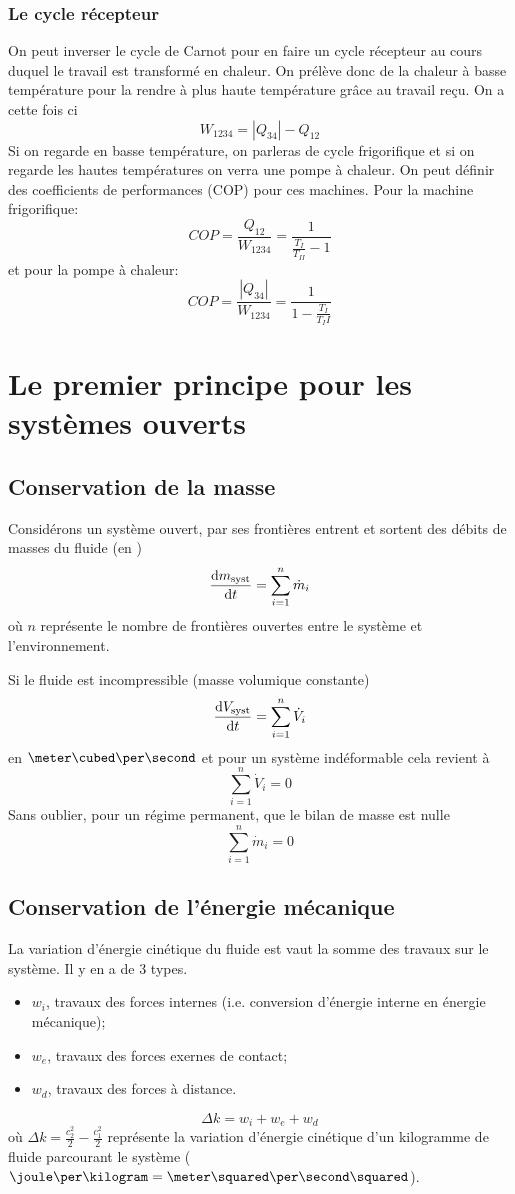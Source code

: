 \subsubsection{Le cycle récepteur}
On peut inverser le cycle de Carnot pour en faire
un cycle récepteur au cours duquel le travail est transformé en chaleur.
On prélève donc de la chaleur à basse température pour
la rendre à plus haute température grâce au travail reçu.
On a cette fois ci
\[ W_{1234} = |Q_{34}|-Q_{12} \]
Si on regarde en basse température, on parleras de cycle frigorifique et
si on regarde les hautes températures on verra une pompe à chaleur.
On peut définir des coefficients de performances (COP) pour ces machines.
Pour la machine frigorifique:
\[  COP =  \frac {Q_{12}}{W_{1234}} = \frac{1}{\frac{T_I}{T_{II}} -1} \]
et pour la pompe à chaleur:
\[  COP = \frac{|Q_{34}|}{W_{1234}} = \frac {1} {1-\frac{T_I}{T_II}} \]

\section{Le premier principe pour les systèmes ouverts}
\subsection{Conservation de la masse}
Considérons un système ouvert, par ses frontières entrent et
sortent des débits de masses du fluide (en \kilogram\per\second)
\[ \frac{\operatorname{d}\! m_\mathrm{syst}}{\operatorname{d}\! t} = \sum_{i = 1}^{n} \dot m_i \]
où $n$ représente le nombre de frontières ouvertes entre
le système et l'environnement.

Si le fluide est incompressible (masse volumique constante)
\[ \frac{\operatorname{d}\! V_\mathrm{syst}}{\operatorname{d}\! t} = \sum_{i = 1}^{n}\dot V_i \]
en $\meter\cubed\per\second$ et pour un système indéformable cela revient à
\[  \sum_{i = 1}^n \dot V_i = 0 \]
Sans oublier, pour un régime permanent, que le bilan de masse est nulle
\[ \sum_{i = 1}^n \dot m_i = 0 \]

\subsection{Conservation de l'énergie mécanique}
La variation d'énergie cinétique du fluide est vaut
la somme des travaux sur le système.
Il y en a de 3 types.
\begin{itemize}
  \item $w_i$, travaux des forces internes
    (i.e. conversion d'énergie interne en énergie mécanique);
  \item $w_e$, travaux des forces exernes de contact;
  \item $w_d$, travaux des forces à distance.
\end{itemize}
\[ \Delta k = w_i + w_e + w_d \]
où $\Delta k = \frac{c_2^2}{2}-\frac{c_1^2}{2}$ représente la variation
d'énergie cinétique d'un kilogramme de fluide parcourant
le système ($\joule\per\kilogram = \meter\squared\per\second\squared$).

